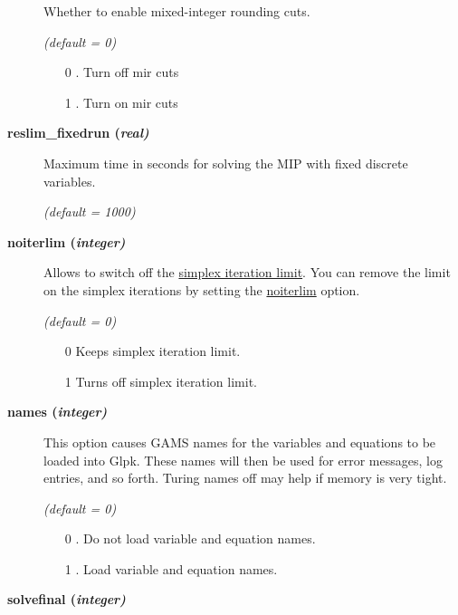 \begin{description}
Whether to enable mixed-integer rounding cuts.

\textsl{(default = 0)}
\begin{itemize}
\item[0] .
Turn off mir cuts
\item[1] .
Turn on mir cuts
\end{itemize}


\item[\label{reslim_fixedrun}\hypertarget{reslim_fixedrun}
{\textbf{reslim\_fixedrun (\slshape{real})}}]\hspace{1.0in}

Maximum time in seconds for solving the MIP with fixed discrete variables.

\textsl{(default = 1000)}

\item[\label{noiterlim}\hypertarget{noiterlim}
{\textbf{noiterlim (\slshape{integer})}}]\hspace{1.0in}

Allows to switch off the \hyperlink{iterlim}{simplex iteration limit}.
You can remove the limit on the simplex iterations by setting the \hyperlink{noiterlim}{noiterlim} option.

\textsl{(default = 0)}
\begin{itemize}
\item[0] 
Keeps simplex iteration limit.
\item[1] 
Turns off simplex iteration limit.
\end{itemize}

\item[\label{glpknames}\hypertarget{glpknames}
{\textbf{names (\slshape{integer})}}]\hspace{1.0in}

This option causes GAMS names for the variables and equations to be loaded into Glpk.
These names will then be used for error messages, log entries, and so forth.
Turing names off may help if memory is very tight.

\textsl{(default = 0)}
\begin{itemize}
\item[0] .
Do not load variable and equation names.
\item[1] .
Load variable and equation names.
\end{itemize}

\item[\label{glpksolvefinal}\hypertarget{glpksolvefinal}
{\textbf{solvefinal (\slshape{integer})}}]\hspace{1.0in}


\end{description}
